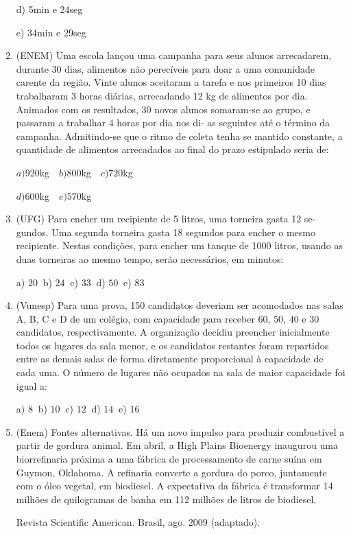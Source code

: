 \begin{multicols*}{2}
\begin{enumerate}
		      d) 5min e 24seg

		      e) 34min e 29seg

		\item (ENEM) Uma escola lançou uma campanha para seus alunos arrecadarem, durante 30 dias, alimentos não perecíveis para doar a uma comunidade carente da região. Vinte alunos aceitaram a tarefa e nos primeiros 10 dias trabalharam 3 horas diárias, arrecadando 12 kg de alimentos por dia. Animados com os resultados, 30 novos alunos somaram-se ao grupo, e passaram a trabalhar 4 horas por dia nos di- as seguintes até o término da campanha. Admitindo-se que o ritmo de coleta tenha se mantido constante, a quantidade de alimentos arrecadados ao final do prazo estipulado seria de:

		      $a)920$kg $ \ \ \ b)800$kg $ \ \ \ c)720$kg

		      $d)600$kg $ \ \ \ e)570$kg

		\item (UFG) Para encher um recipiente de 5 litros, uma torneira gasta 12 se- gundos. Uma segunda torneira gasta 18 segundos para encher o mesmo recipiente. Nestas condições, para encher um tanque de 1000 litros, usando as duas torneiras ao mesmo tempo, serão necessários, em minutos:

		      a) $20 \ $ b) $24 \ $ c) $33 \ $ d) $50 \ $ e) $83 $

		\item (Vunesp) Para uma prova, 150 candidatos deveriam ser acomodados nas salas A, B, C e D de um colégio, com capacidade para receber 60, 50, 40 e 30 candidatos, respectivamente. A organização decidiu preencher inicialmente todos os lugares da sala menor, e os candidatos restantes foram repartidos entre as demais salas de forma diretamente proporcional à capacidade de cada uma. O número de lugares não ocupados na sala de maior capacidade foi igual a:

		      a) $8 \ $ b) $10 \ $ c) $12 \ $ d) $14 \ $ e) $16 $

		\item (Enem) Fontes alternativas. Há um novo impulso para produzir combustível a partir de gordura animal. Em abril, a High Plains Bioenergy inaugurou uma biorrefinaria próxima a uma fábrica de processamento de carne suína em Guymon, Oklahoma. A refinaria converte a gordura do porco, juntamente com o óleo vegetal, em biodiesel. A expectativa da fábrica é transformar 14 milhões de quilogramas de banha em 112 milhões de litros de biodiesel.

		      Revista Scientific American. Brasil, ago. 2009 (adaptado).


\end{enumerate}
\end{multicols*}
